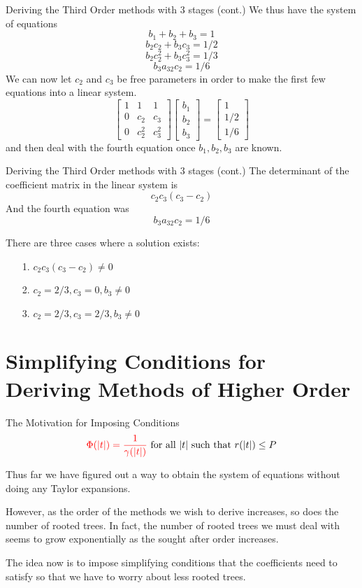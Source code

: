 \documentclass{beamer}
\def \red{\textcolor{red}}
\begin{document}
\begin{frame}{Deriving the Third Order methods with 3 stages (cont.)}
We thus have the system of equations
$$b_1 + b_2 + b_3 = 1$$
$$b_2c_2 + b_3c_3 = 1/2$$
$$b_2c_2^2 + b_3c_3^2 = 1/3$$
$$b_3a_{32}c_2 = 1/6$$
We can now let $c_2$ and $c_3$ be free parameters
in order to make the first few equations into a linear system.
$$\left[ \begin{matrix}
1 & 1 & 1 \\
0 & c_2 & c_3 \\
0 & c_2^2 & c_3^2
\end{matrix} \right] 
\left[ \begin{matrix} 
b_1 \\ b_2 \\ b_3
\end{matrix} \right] = 
\left[ \begin{matrix} 
1 \\ 1/2 \\ 1/6
\end{matrix} \right]$$
and then deal with the fourth equation once $b_1, b_2, b_3$ are known.
\end{frame}

\begin{frame}{Deriving the Third Order methods with 3 stages (cont.)}
The determinant of the coefficient matrix in the linear system is 
$$c_2c_3(c_3 - c_2)$$
And the fourth equation was
$$b_3a_{32}c_2 = 1/6$$

There are three cases where a solution exists:
\begin{enumerate}
\item[1.] $c_2c_3(c_3 - c_2) \ne 0$
\item[2.] $c_2 = 2/3, c_3 = 0, b_3 \ne 0$
\item[3.] $c_2 = 2/3, c_3 = 2/3, b_3 \ne 0$
\end{enumerate}
\end{frame}

\section[Simplifying Conditions for Deriving Methods]{Simplifying Conditions for Deriving Methods of Higher Order}

\begin{frame}{The Motivation for Imposing Conditions}
$$\red{\Phi(|t|) = \frac{1}{\gamma(|t|)}} \mbox{ for all } |t| \mbox{ such that } r(|t|) \le P$$

Thus far we have figured out a way to obtain the system of equations without doing any Taylor expansions. \newline

However, as the order of the methods we wish to derive increases, so does the number of rooted trees. 
In fact, the number of rooted trees we must deal with seems to grow exponentially as the sought after order
increases. \newline

The idea now is to impose simplifying conditions that the coefficients need to satisfy so that we have to worry about
less rooted trees.
\end{frame}
\end{document}
